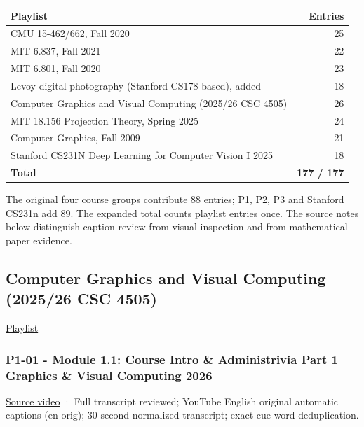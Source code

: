 {\def\LTcaptype{none} %
\begin{longtable}[]{@{}lr@{}}
\toprule\noalign{}
Playlist & Entries \\
\midrule\noalign{}
\endhead
\bottomrule\noalign{}
\endlastfoot
CMU 15-462/662, Fall 2020 & 25 \\
MIT 6.837, Fall 2021 & 22 \\
MIT 6.801, Fall 2020 & 23 \\
Levoy digital photography (Stanford CS178 based), added & 18 \\
Computer Graphics and Visual Computing (2025/26 CSC 4505) & 26 \\
MIT 18.156 Projection Theory, Spring 2025 & 24 \\
Computer Graphics, Fall 2009 & 21 \\
Stanford CS231N Deep Learning for Computer Vision I 2025 & 18 \\
\textbf{Total} & \textbf{177 / 177} \\
\end{longtable}
}

The original four course groups contribute 88 entries; P1, P2, P3 and Stanford CS231n add 89. The expanded total counts playlist entries once. The source notes below distinguish caption review from visual inspection and from mathematical-paper evidence.

\subsection{Computer Graphics and Visual Computing (2025/26 CSC 4505)}\label{04-visual-computing-ii-ch036-computer-graphics-and-visual-computing-202526-csc-4505}

\href{https://www.youtube.com/playlist?list=PLubb3AIPdPhYu-auUzK10YzvERCshyQ9M}{Playlist}

\subsubsection{P1-01 - Module 1.1: Course Intro \& Administrivia Part 1 Graphics \& Visual Computing 2026}\label{04-visual-computing-ii-ch036-p1-01---module-1.1-course-intro-administrivia-part-1-graphics-visual-computing-2026}

\href{https://www.youtube.com/watch?v=dA0O3xbMhZw}{Source video} · Full transcript reviewed; YouTube English original automatic captions (en-orig); 30-second normalized transcript; exact cue-word deduplication.

